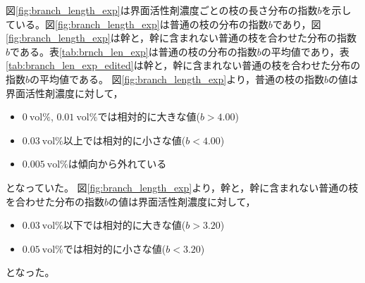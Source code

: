 \documentclass[autodetect-engine,dvi=dvipdfmx,a4paper,ja=standard,oneside,openany,11pt]{bxjsbook}
\begin{document}
図\ref{fig:branch_length_exp}は界面活性剤濃度ごとの枝の長さ分布の指数$b$を示している。図\ref{fig:branch_length_exp}は普通の枝の分布の指数$b$であり，図\ref{fig:branch_length_exp}は幹と，幹に含まれない普通の枝を合わせた分布の指数$b$である。表\ref{tab:brnch_len_exp}は普通の枝の分布の指数$b$の平均値であり，表\ref{tab:branch_len_exp_edited}は幹と，幹に含まれない普通の枝を合わせた分布の指数$b$の平均値である。
図\ref{fig:branch_length_exp}より，普通の枝の指数$b$の値は界面活性剤濃度に対して，
\begin{itemize}
  \item $\SI{0}{\mathrm{vol}\%}$, $\SI{0.01}{\mathrm{vol}\%}$では相対的に大きな値($b>4.00$)
  \item $\SI{0.03}{\mathrm{vol}\%}$以上では相対的に小さな値($b<4.00$)
  \item $\SI{0.005}{\mathrm{vol}\%}$は傾向から外れている
\end{itemize}
となっていた。
図\ref{fig:branch_length_exp}より，幹と，幹に含まれない普通の枝を合わせた分布の指数$b$の値は界面活性剤濃度に対して，
\begin{itemize}
  \item $\SI{0.03}{\mathrm{vol}\%}$以下では相対的に大きな値($b>3.20$)
  \item $\SI{0.05}{\mathrm{vol}\%}$では相対的に小さな値($b<3.20$)
\end{itemize}
となった。
\ifdraft{
  
  
}{}
\end{document}
